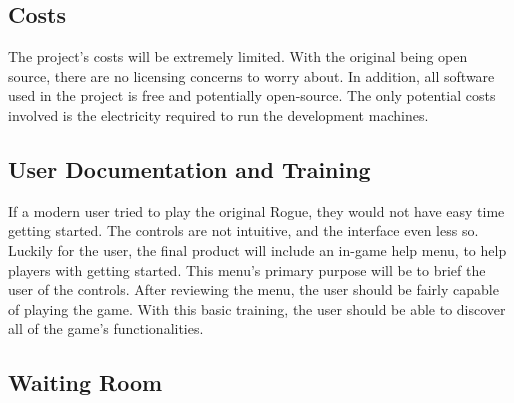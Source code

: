 \documentclass[12pt, titlepage]{article}
\begin{document}
	\subsection{Costs}

		The project's costs will be extremely limited. With the original being open source, there are no licensing concerns to worry about. In addition, all software used in the project is free and potentially open-source. The only potential costs involved is the electricity required to run the development machines.

	\subsection{User Documentation and Training}

		If a modern user tried to play the original Rogue, they would not have easy time getting started. The controls are not intuitive, and the interface even less so. Luckily for the user, the final product will include an in-game help menu, to help players with getting started. This menu's primary purpose will be to brief the user of the controls. After reviewing the menu, the user should be fairly capable of playing the game. With this basic training, the user should be able to discover all of the game's functionalities.

	\subsection{Waiting Room}
\end{document}
